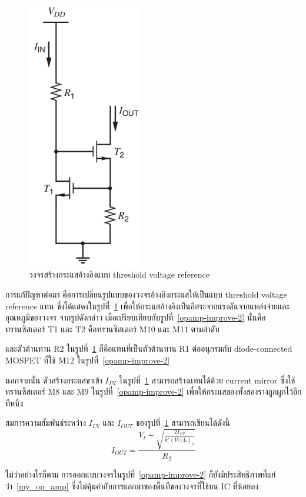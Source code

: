 \documentclass[a4paper, 11pt, oneside]{book} %
\begin{document}
\begin{figure}[h]
    \centering
    \includegraphics[width = 5cm]{threshold-ref}
    \caption{วงจรสร้างกระแสอ้างอิงแบบ threshold voltage reference}
    \label{threshold-ref}
\end{figure}

การแก้ปัญหาต่อมา คือการเปลี่ยนรูปแบบของวงจรอ้างอิงกระแสให้เป็นแบบ threshold voltage reference แทน ซึ่งได้แสดงในรูปที่~\ref{threshold-ref} \cite{Grey09} เพื่อให้กระแสอ้างอิงเป็นอิสระจากแรงดันจากแหล่งจ่ายและอุณหภูมิของวงจร จากรูปดังกล่าว เมื่อเปรียบเทียบกับรูปที่~\ref{opamp-improve-2} นั่นคือ ทรานซิสเตอร์ T1 และ T2 คือทรานซิสเตอร์ M10 และ M11 ตามลำดับ 

และตัวต้านทาน R2 ในรูปที่~\ref{threshold-ref} ก็คือแทนที่เป็นตัวต้านทาน R1 ต่ออนุกรมกับ diode-connected MOSFET ที่ใช้ M12 ในรูปที่~\ref{opamp-improve-2} 

นอกจากนั้น ตัวสร้างกระแสขาเข้า $I_{IN}$ ในรูปที่~\ref{threshold-ref} สามารถสร้างแทนได้ด้วย current mirror ซึ่งใช้ทรานซิสเตอร์ M8 และ M9 ในรูปที่~\ref{opamp-improve-2} เพื่อให้กระแสของทั้งสองรางถูกผูกไว้อีกทีหนึ่ง

สมการความสัมพันธ์ระหว่าง $I_{IN}$ และ $I_{OUT}$ ของรูปที่~\ref{threshold-ref} สามารถเขียนได้ดังนี้ \cite{Grey09} 
$$I_{OUT} = \frac{V_t + \sqrt{\frac{2I_{IN}}{k'(W/L)_1}}}{R_2}$$

ไม่ว่าอย่างไรก็ตาม การออกแบบวงจรในรูปที่~\ref{opamp-improve-2} ก็ยังมีประสิทธิภาพที่แย่ว่า~\ref{my_op_amp} ซึ่งไม่คุ้มค่ากับการแลกมาของพื้นทีของวงจรที่ใช้บน IC ที่น้อยลง
\end{document}
